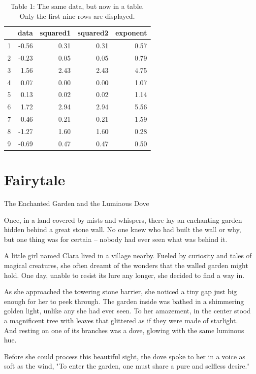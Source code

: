 \documentclass[10pt, a4paper, titlepage]{article}
\begin{document}
\begin{table}[!ht]
\centering
\caption{Table 1: The same data, but now in a table. Only the first nine rows are
displayed.}
\begin{tabular}{rrrrr}
  \hline
 & data & squared1 & squared2 & exponent \\ 
  \hline
1 & -0.56 & 0.31 & 0.31 & 0.57 \\ 
  2 & -0.23 & 0.05 & 0.05 & 0.79 \\ 
  3 & 1.56 & 2.43 & 2.43 & 4.75 \\ 
  4 & 0.07 & 0.00 & 0.00 & 1.07 \\ 
  5 & 0.13 & 0.02 & 0.02 & 1.14 \\ 
  6 & 1.72 & 2.94 & 2.94 & 5.56 \\ 
  7 & 0.46 & 0.21 & 0.21 & 1.59 \\ 
  8 & -1.27 & 1.60 & 1.60 & 0.28 \\ 
  9 & -0.69 & 0.47 & 0.47 & 0.50 \\ 
   \hline
\end{tabular}
\end{table}

\newpage

\section{Fairytale}

The Enchanted Garden and the Luminous Dove

Once, in a land covered by mists and whispers, there lay an enchanting garden hidden behind a great stone wall. No one knew who had built the wall or why, but one thing was for certain – nobody had ever seen what was behind it.

A little girl named Clara lived in a village nearby. Fueled by curiosity and tales of magical creatures, she often dreamt of the wonders that the walled garden might hold. One day, unable to resist its lure any longer, she decided to find a way in.

As she approached the towering stone barrier, she noticed a tiny gap just big enough for her to peek through. The garden inside was bathed in a shimmering golden light, unlike any she had ever seen. To her amazement, in the center stood a magnificent tree with leaves that glittered as if they were made of starlight. And resting on one of its branches was a dove, glowing with the same luminous hue.

Before she could process this beautiful sight, the dove spoke to her in a voice as soft as the wind, "To enter the garden, one must share a pure and selfless desire."
\end{document}

